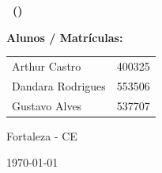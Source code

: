\begin{titlepage}
    \thispagestyle{fancy} 
    \centering
    \vspace*{1cm}
    
    {\Large \textbf{\disciplina\ (\coddisciplina)}\par}
    \vspace{0.3cm}
    {\large \professor\par}
    
    \vspace{2.5cm}
    
    {\LARGE \bfseries \numpratica\par}
    
    \vfill
    
    \begin{center}
        \textbf{Alunos / Matrículas:}\\[0.3cm]
        \begin{tabular}{ll}
            Arthur Castro       & 400325 \\
            Dandara Rodrigues   & 553506 \\
            Gustavo Alves       & 537707
        \end{tabular}
    \end{center}
    
    \vfill
    
    {\large Fortaleza - CE\par}
    {\large \today\par}
\end{titlepage}